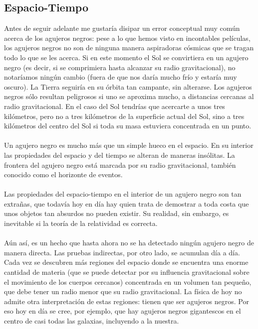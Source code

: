 \documentclass[12pt]{article}
\begin{document}
\subsection{Espacio-Tiempo}
Antes de seguir adelante me gustaría disipar un error conceptual muy común acerca de los agujeros negros: pese a lo que hemos visto en incontables películas, los agujeros negros no son de ninguna manera aspiradoras cósmicas que se tragan todo lo que se les acerca. Si en este momento el Sol se convirtiera en un agujero negro (es decir, si se comprimiera hasta alcanzar su radio gravitacional), no notaríamos ningún cambio (fuera de que nos daría mucho frío y estaría muy oscuro). La Tierra seguiría en su órbita tan campante, sin alterarse. Los agujeros negros sólo resultan peligrosos si uno se aproxima mucho, a distancias cercanas al radio gravitacional. En el caso del Sol tendrías que acercarte a unos tres kilómetros, pero no a tres kilómetros de la superficie actual del Sol, sino a tres kilómetros del centro del Sol si toda su masa estuviera concentrada en un punto.\\\\
Un agujero negro es mucho más que un simple hueco en el espacio. En su interior las propiedades del espacio y del tiempo se alteran de maneras insólitas. La frontera del agujero negro está marcada por su radio gravitacional, también conocido como el horizonte de eventos.\\\\
Las propiedades del espacio-tiempo en el interior de un agujero negro son tan extrañas, que todavía hoy en día hay quien trata de demostrar a toda costa que unos objetos tan absurdos no pueden existir. Su realidad, sin embargo, es inevitable si la teoría de la relatividad es correcta.\\\\
Aún así, es un hecho que hasta ahora no se ha detectado ningún agujero negro de manera directa. Las pruebas indirectas, por otro lado, se acumulan día a día. Cada vez se descubren más regiones del espacio donde se encuentra una enorme cantidad de materia (que se puede detectar por su influencia gravitacional sobre el movimiento de los cuerpos cercanos) concentrada en un volumen tan pequeño, que debe tener un radio menor que su radio gravitacional. La física de hoy no admite otra interpretación de estas regiones: tienen que ser agujeros negros. Por eso hoy en día se cree, por ejemplo, que hay agujeros negros gigantescos en el centro de casi todas las galaxias, incluyendo a la nuestra.
\\\\
\end{document}
